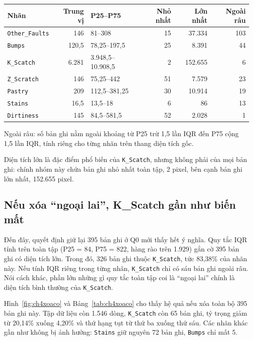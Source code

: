 \documentclass[12pt,a4paper,oneside]{report}
\newcommand{\maCot}[1]{{\urlstyle{tt}\def\UrlBreaks{\do\_\do\/\do\.}\def\UrlBigBreaks{}\nolinkurl{#1}}}
\begin{document}
\begin{center}\begin{minipage}{\linewidth}
\label{tab:ch4area}
\small{}
\begin{tabularx}{\linewidth}{@{}Y r p{3.1cm}r r r@{}}
\toprule
Nhãn & Trung vị & P25--P75 & Nhỏ nhất & Lớn nhất & Ngoài râu \\
\midrule
\maCot{Other_Faults} & 146 & 81--308 & 15 & 37.334 & 103 \\
\maCot{Bumps} & 120,5 & 78,25--197,5 & 25 & 8.391 & 44 \\
\maCot{K_Scatch} & 6.281 & 3.948,5--10.908,5 & 2 & 152.655 & 6 \\
\maCot{Z_Scratch} & 146 & 75,25--442 & 51 & 7.579 & 23 \\
\maCot{Pastry} & 209 & 112,5--381,25 & 30 & 10.914 & 19 \\
\maCot{Stains} & 16,5 & 13,5--18 & 6 & 86 & 13 \\
\maCot{Dirtiness} & 145 & 84,5--581,5 & 52 & 2.028 & 1 \\
\bottomrule
\end{tabularx}
\smallskip
\par\raggedright\footnotesize Ngoài râu: số bản ghi nằm ngoài khoảng từ P25 trừ 1,5 lần IQR đến P75 cộng 1,5 lần IQR, tính riêng cho từng nhãn trên thang diện tích gốc.
\end{minipage}\end{center}

Diện tích lớn là đặc điểm phổ biến của \maCot{K_Scatch}, nhưng không phải của mọi bản ghi: chính nhóm này chứa bản ghi nhỏ nhất toàn tập, 2 pixel, bên cạnh bản ghi lớn nhất, 152.655 pixel.

\subsection{Nếu xóa ``ngoại lai'', K\_Scatch gần như biến mất}

Đến đây, quyết định giữ lại 395 bản ghi ở Q0 mới thấy hết ý nghĩa. Quy tắc IQR tính trên toàn tập (P25 = 84, P75 = 822, hàng rào trên 1.929) gắn cờ 395 bản ghi có diện tích lớn. Trong đó, 326 bản ghi thuộc \maCot{K_Scatch}, tức 83,38\% của nhãn này. Nếu tính IQR riêng trong từng nhãn, \maCot{K_Scatch} chỉ có sáu bản ghi ngoài râu. Nói cách khác, phần lớn những gì quy tắc toàn tập coi là ``ngoại lai'' chính là diện tích bình thường của \maCot{K_Scatch}.

Hình~\ref{fig:ch4xoaco} và Bảng~\ref{tab:ch4xoaco} cho thấy hệ quả nếu xóa toàn bộ 395 bản ghi này. Tập dữ liệu còn 1.546 dòng, \maCot{K_Scatch} còn 65 bản ghi, tỷ trọng giảm từ 20,14\% xuống 4,20\% và thứ hạng tụt từ thứ ba xuống thứ sáu. Các nhãn khác gần như không bị ảnh hưởng: \maCot{Stains} giữ nguyên 72 bản ghi, \maCot{Bumps} chỉ mất 5.
\end{document}
